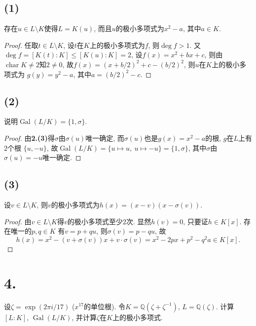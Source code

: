 \documentclass[12pt, a4paper, fontset=windows]{ctexart}
\newcommand{\Q}{\mathbb{Q}}
\newcommand{\Gal}{\operatorname{Gal}}
\newcommand{\ch}{\operatorname{char}}
\begin{document}
\subsection*{(1)}

存在$u\in L\setminus K$使得$L=K(u)$, 
而且$u$的极小多项式为$x^2-a$, 其中$a\in K$. 

\begin{proof}
任取$t\in L\setminus K$, 设$t$在$K$上的极小多项式为$f$, 
则$\deg f>1$. 又$\deg f=[K(t):K]\le[K(u):K]=2$, 
设$f(x)=x^2+bx+c$, 则由$\ch K\ne 2$知$2\ne 0$, 
故$f(x)=(x+b/2)^2+c-(b/2)^2$, 则$u$在$K$上的极小多项式为
$g(y)=y^2-a$, 其中$a=(b/2)^2-c$. 
\end{proof}

\subsection*{(2)}

说明$\Gal(L/K)=\{1,\sigma\}$. 

\begin{proof}
由{\bf 2.(3)}得$\sigma$由$\sigma(u)$唯一确定, 
而$\sigma(u)$也是$g(x)=x^2-a$的根, $g$在$L$上有$2$个根
$\{u,-u\}$, 故$\Gal(L/K)=\{u\mapsto u,\ u\mapsto -u\}=\{1,\sigma\}$, 
其中$\sigma$由$\sigma(u)=-u$唯一确定. 
\end{proof}

\subsection*{(3)}

设$v\in L\setminus K$, 则$v$的极小多项式为$h(x)=(x-v)(x-\sigma(v))$. 

\begin{proof}
由$v\in L\setminus K$得$v$的极小多项式至少$2$次. 
显然$h(v)=0$, 只要证$h\in K[x]$. 存在唯一的$p,q\in K$
有$v=p+qu$, 则$\sigma(v)=p-qu$, 故
\[h(x)=x^2-(v+\sigma(v))x+v\cdot\sigma(v)=x^2-2px+p^2-q^2a\in K[x].\]
\end{proof}

\section*{4.}

设$\zeta=\exp(2\pi i/17)$ ($x^{17}$的单位根). 
令$K=\Q(\zeta+\zeta^{-1})$, $L=\Q(\zeta)$. 
计算$[L:K]$, $\Gal(L/K)$, 并计算$\zeta$在$K$上的极小多项式. 
\end{document}
